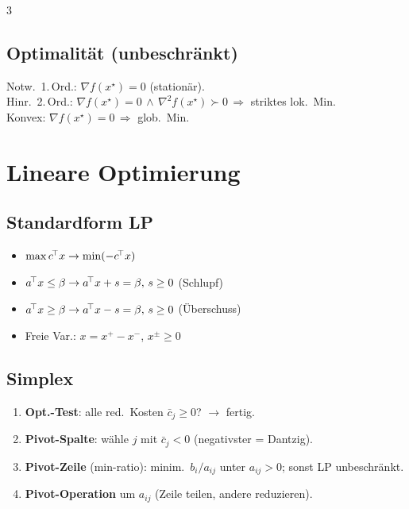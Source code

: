 \documentclass[8pt,a4paper]{extarticle}
\begin{document}
\begin{multicols*}{3}
\subsection{Optimalit\"at (unbeschr\"ankt)}
Notw.\ 1.\,Ord.: $\nabla f(x^\star)=0$ (station\"ar).\\
Hinr.\ 2.\,Ord.: $\nabla f(x^\star){=}0\,\wedge\,\nabla^2 f(x^\star)\succ 0\,\Rightarrow$ striktes lok.\ Min.\\
Konvex: $\nabla f(x^\star){=}0\,\Rightarrow$ glob.\ Min.

\section{Lineare Optimierung}
\subsection{Standardform LP}
\begin{itemize}
\item $\max c^{\!\top} x \to \min (-c^{\!\top} x)$
\item $a^{\!\top} x\le \beta \to a^{\!\top} x+s=\beta,\,s\ge 0$ (Schlupf)
\item $a^{\!\top} x\ge \beta \to a^{\!\top} x-s=\beta,\,s\ge 0$ (\"Uberschuss)
\item Freie Var.: $x=x^+-x^-$, $x^\pm\ge 0$
\end{itemize}

\subsection{Simplex}
\begin{enumerate}
\item \textbf{Opt.-Test}: alle red.\ Kosten $\bar c_j\!\ge\!0$? $\to$ fertig.
\item \textbf{Pivot-Spalte}: w\"ahle $j$ mit $\bar c_j\!<\!0$ (negativster = Dantzig).
\item \textbf{Pivot-Zeile} (min-ratio): minim.\ $b_i/a_{ij}$ unter $a_{ij}>0$; sonst LP unbeschr\"ankt.
\item \textbf{Pivot-Operation} um $a_{ij}$ (Zeile teilen, andere reduzieren).
\end{enumerate}


\end{multicols*}
\end{document}
